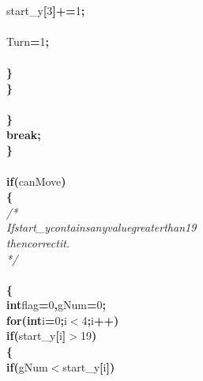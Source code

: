 \documentclass[a4paper, 10pt]{article}
\newcommand\SPC{\hspace*{0.6em}}
\newcommand{\CppAComment}[1]{\textit{\textcolor[rgb]{0.2,0.6,1}{#1}}}
\newcommand{\CppAIdentifier}[1]{#1}
\newcommand{\CppANumber}[1]{\textcolor[rgb]{0.5,0,0.5}{#1}}
\newcommand{\CppAReservedWord}[1]{\textbf{#1}}
\newcommand{\CppASpace}[1]{\colorbox[rgb]{1,1,1}{#1}}
\newcommand{\CppASymbol}[1]{\textbf{\textcolor[rgb]{1,0,0}{#1}}}
\begin{document}
\begin{ttfamily}
\CppASpace{\SPC \SPC \SPC \SPC \SPC }\CppAIdentifier{start\_y}\CppASymbol{[}\CppANumber{3}\CppASymbol{]}\CppASymbol{+=}\CppANumber{1}\CppASymbol{;}\\
\\
\CppASpace{\SPC \SPC \SPC \SPC \SPC }\CppAIdentifier{Turn}\CppASpace{\SPC }\CppASymbol{=}\CppASpace{\SPC }\CppANumber{1}\CppASymbol{;}\\
\\
\CppASpace{\SPC \SPC \SPC \SPC }\CppASymbol{\}}\\
\CppASpace{\SPC \SPC \SPC }\CppASymbol{\}}\\
\\
\CppASpace{\SPC \SPC }\CppASymbol{\}}\\
\CppASpace{\SPC \SPC }\CppAReservedWord{break}\CppASymbol{;}\\
\CppASpace{\SPC }\CppASymbol{\}}\\
\\
\CppASpace{\SPC }\CppAReservedWord{if}\CppASymbol{(}\CppAIdentifier{canMove}\CppASymbol{)}\\
\CppASpace{\SPC }\CppASymbol{\{}\\
\CppASpace{\SPC \SPC }\CppAComment{/*}\\
\CppAComment{\SPC \SPC \SPC \SPC \SPC If\SPC start\_y\SPC contains\SPC any\SPC value\SPC \SPC greater\SPC than\SPC 19}\\
\CppAComment{\SPC \SPC \SPC \SPC \SPC then\SPC correct\SPC it.}\\
\CppAComment{\SPC \SPC */}\\
\\
\CppASpace{\SPC \SPC }\CppASymbol{\{}\\
\CppASpace{\SPC \SPC \SPC }\CppAReservedWord{int}\CppASpace{\SPC }\CppAIdentifier{flag}\CppASymbol{=}\CppANumber{0}\CppASymbol{,}\CppAIdentifier{gNum}\CppASymbol{=}\CppANumber{0}\CppASymbol{;}\\
\CppASpace{\SPC \SPC \SPC }\CppAReservedWord{for}\CppASymbol{(}\CppAReservedWord{int}\CppASpace{\SPC }\CppAIdentifier{i}\CppASymbol{=}\CppANumber{0}\CppASymbol{;}\CppAIdentifier{i}\CppASymbol{$<$}\CppANumber{4}\CppASymbol{;}\CppAIdentifier{i}\CppASymbol{++}\CppASymbol{)}\\
\CppASpace{\SPC \SPC \SPC \SPC }\CppAReservedWord{if}\CppASymbol{(}\CppAIdentifier{start\_y}\CppASymbol{[}\CppAIdentifier{i}\CppASymbol{]}\CppASymbol{$>$}\CppANumber{19}\CppASymbol{)}\\
\CppASpace{\SPC \SPC \SPC \SPC }\CppASymbol{\{}\\
\CppASpace{\SPC \SPC \SPC \SPC \SPC }\CppAReservedWord{if}\CppASymbol{(}\CppAIdentifier{gNum}\CppASymbol{$<$}\CppAIdentifier{start\_y}\CppASymbol{[}\CppAIdentifier{i}\CppASymbol{]}\CppASymbol{)}\\

\end{ttfamily}
\end{document}
